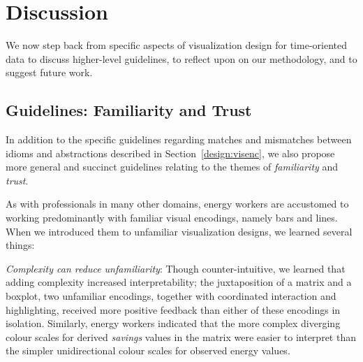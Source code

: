 \documentclass[journal]{vgtc}                %
\newcommand{\bstart}[1]{\vspace{1mm} \noindent{\textbf{#1:}}}
\begin{document}

\section{Discussion}
\label{discussion}


We now step back from specific aspects of visualization design for time-oriented data to discuss higher-level guidelines, to reflect upon on our methodology, and to suggest future work.


\subsection{Guidelines: Familiarity and Trust}
\label{discussion-guidelines}


In addition to the specific guidelines regarding matches and mismatches between idioms and abstractions described in Section~\ref{design:visenc}, we also propose more general and succinct guidelines relating to the themes of {\it familiarity} and {\it trust}.

\bstart{Familiarity} As with professionals in many other domains, energy workers are accustomed to working predominantly with familiar visual encodings, namely bars and lines.
When we introduced them to unfamiliar visualization designs, we learned several things:

{\it Complexity can reduce unfamiliarity}: Though counter-intuitive, we learned that adding complexity increased interpretability; the juxtaposition of a matrix and a boxplot, two unfamiliar encodings, together with coordinated interaction and highlighting, received more positive feedback than either of these encodings in isolation.
Similarly, energy workers indicated that the more complex diverging colour scales for derived {\it savings} values in the matrix were easier to interpret than the simpler unidirectional colour scales for observed energy values. %
\end{document}
